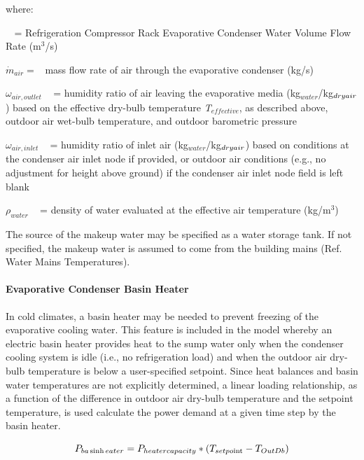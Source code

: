 where:

\(\mathop {{{\dot V}_{evaporation,makeup}}}\limits^{}\) = Refrigeration Compressor Rack Evaporative Condenser Water Volume Flow Rate (m\(^{3}\)/s)

\(\dot m_{air} = \) ~mass flow rate of air through the evaporative condenser (kg/s)

\({\omega_{air,outlet}}\) ~ = humidity ratio of air leaving the evaporative media (kg\(_{water}\)/kg\(_{dry\\ air}\)) based on the effective dry-bulb temperature \emph{T\(_{effective}\)}, as described above, outdoor air wet-bulb temperature, and outdoor barometric pressure

\({\omega_{air,inlet}}\) ~ = humidity ratio of inlet air (kg\(_{water}\)/kg\(_{dry\\ air}\)) based on conditions at the condenser air inlet node if provided, or outdoor air conditions (e.g., no adjustment for height above ground) if the condenser air inlet node field is left blank

\({\rho_{water}}\) ~ = density of water evaluated at the effective air temperature (kg/m\(^{3}\))

The source of the makeup water may be specified as a water storage tank. If not specified, the makeup water is assumed to come from the building mains (Ref. Water Mains Temperatures).

\paragraph{Evaporative Condenser Basin Heater}\label{evaporative-condenser-basin-heater}

In cold climates, a basin heater may be needed to prevent freezing of the evaporative cooling water. This feature is included in the model whereby an electric basin heater provides heat to the sump water only when the condenser cooling system is idle (i.e., no refrigeration load) and when the outdoor air dry-bulb temperature is below a user-specified setpoint. Since heat balances and basin water temperatures are not explicitly determined, a linear loading relationship, as a function of the difference in outdoor air dry-bulb temperature and the setpoint temperature, is used calculate the power demand at a given time step by the basin heater.

\begin{equation}
{P_{ba\sinh eater}} = {P_{heatercapacity}}*({T_{setpo{\mathop{\rm int}} }} - {T_{OutDb}})
\end{equation}

